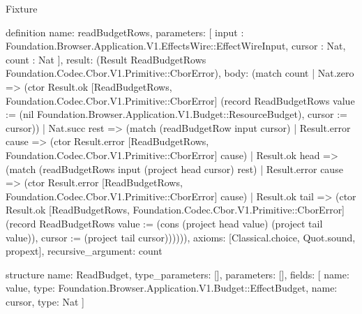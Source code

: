 \begin{lexlean}{Fixture}
\begin{semanticmodule}
definition{
  name: readBudgetRows,
  parameters: [
    input : Foundation.Browser.Application.V1.EffectsWire::EffectWireInput,
    cursor : Nat,
    count : Nat
  ],
  result: (Result ReadBudgetRows Foundation.Codec.Cbor.V1.Primitive::CborError),
  body: (match count
    | Nat.zero => (ctor Result.ok [ReadBudgetRows, Foundation.Codec.Cbor.V1.Primitive::CborError] (record ReadBudgetRows {value := (nil Foundation.Browser.Application.V1.Budget::ResourceBudget), cursor := cursor}))
    | Nat.succ rest => (match (readBudgetRow input cursor)
      | Result.error cause => (ctor Result.error [ReadBudgetRows, Foundation.Codec.Cbor.V1.Primitive::CborError] cause)
      | Result.ok head => (match (readBudgetRows input (project head cursor) rest)
        | Result.error cause => (ctor Result.error [ReadBudgetRows, Foundation.Codec.Cbor.V1.Primitive::CborError] cause)
        | Result.ok tail => (ctor Result.ok [ReadBudgetRows, Foundation.Codec.Cbor.V1.Primitive::CborError] (record ReadBudgetRows {value := (cons (project head value) (project tail value)), cursor := (project tail cursor)}))))),
  axioms: [Classical.choice, Quot.sound, propext],
  recursive_argument: count
}

structure{
  name: ReadBudget,
  type_parameters: [],
  parameters: [],
  fields: [
    {name: value, type: Foundation.Browser.Application.V1.Budget::EffectBudget},
    {name: cursor, type: Nat}
  ]
}


\end{semanticmodule}
\end{lexlean}
